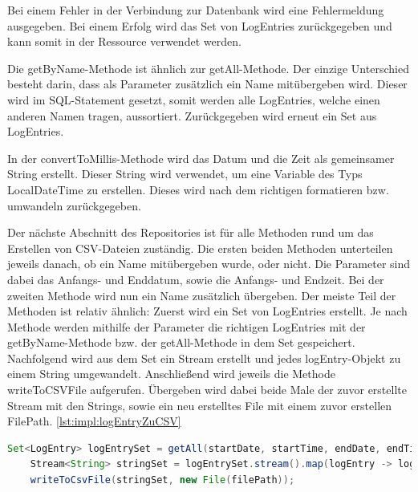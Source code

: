 Bei einem Fehler in der Verbindung zur Datenbank wird eine Fehlermeldung ausgegeben. Bei einem Erfolg wird das Set von LogEntries zurückgegeben und kann somit in der Ressource verwendet werden.
 
Die getByName-Methode ist ähnlich zur getAll-Methode. Der einzige Unterschied besteht darin, dass als Parameter zusätzlich ein Name mitübergeben wird. Dieser wird im SQL-Statement gesetzt, somit werden alle LogEntries, welche einen anderen Namen tragen, aussortiert. Zurückgegeben wird erneut ein Set aus LogEntries.
 
In der convertToMillis-Methode wird das Datum und die Zeit als gemeinsamer String erstellt. Dieser String wird verwendet, um eine Variable des Typs LocalDateTime zu erstellen. Dieses wird nach dem richtigen formatieren bzw. umwandeln zurückgegeben.
 
Der nächste Abschnitt des Repositories ist für alle Methoden rund um das Erstellen von CSV-Dateien zuständig. Die ersten beiden Methoden unterteilen jeweils danach, ob ein Name mitübergeben wurde, oder nicht. Die Parameter sind dabei das Anfangs- und Enddatum, sowie die Anfangs- und Endzeit. Bei der zweiten Methode wird nun ein Name zusätzlich übergeben. Der meiste Teil der Methoden ist relativ ähnlich: Zuerst wird ein Set von LogEntries erstellt. Je nach Methode werden mithilfe der Parameter die richtigen LogEntries mit der getByName-Methode bzw. der getAll-Methode in dem Set gespeichert. Nachfolgend wird aus dem Set ein Stream erstellt und jedes logEntry-Objekt zu einem String umgewandelt. Anschließend wird jeweils die Methode writeToCSVFile aufgerufen. Übergeben wird dabei beide Male der zuvor erstellte Stream mit den Strings, sowie ein neu erstelltes File mit einem zuvor erstellen FilePath. \ref{lst:impl:logEntryZuCSV}

\begin{lstlisting}[language=java,caption=LogEntrySet zu CSV umwandeln,label=lst:impl:logEntryZuCSV]
    Set<LogEntry> logEntrySet = getAll(startDate, startTime, endDate, endTime);
    Stream<String> stringSet = logEntrySet.stream().map(logEntry -> logEntry.toString());
    writeToCsvFile(stringSet, new File(filePath));
\end{lstlisting}

